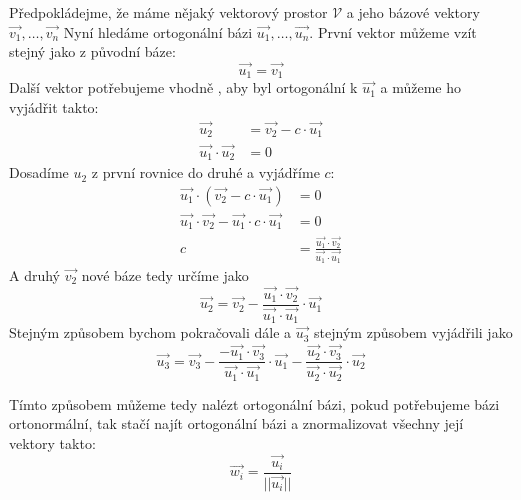 Předpokládejme, že máme nějaký vektorový prostor $\mathcal{V}$ a jeho bázové
vektory $\vec{v_1}, \ldots, \vec{v_n}$
Nyní hledáme ortogonální bázi $\vec{u_1}, \ldots, \vec{u_n}$.
První vektor můžeme vzít stejný jako z původní báze:
$$\vec{u_1} = \vec{v_1}$$
Další vektor potřebujeme vhodně , aby byl ortogonální
k $\vec{u_1}$ a můžeme ho vyjádřit takto:
\begin{align*}
    \vec{u_2} &= \vec{v_2} - c \cdot \vec{u_1}\\
    \vec{u_1} \cdot \vec{u_2} &= 0
\end{align*}
Dosadíme $u_2$ z první rovnice do druhé a vyjádříme $c$:
\begin{align*}
    \vec{u_1} \cdot (\vec{v_2} - c \cdot \vec{u_1}) &= 0\\
    \vec{u_1} \cdot \vec{v_2} - \vec{u_1} \cdot c \cdot \vec{u_1} &= 0\\
    c &= \frac{\vec{u_1} \cdot \vec{v_2}}{\vec{u_1}\cdot \vec{u_1}}
\end{align*}
A druhý  $\vec{v_2}$ nové báze tedy určíme jako
$$\vec{u_2} = \vec{v_2} - \frac{\vec{u_1} \cdot \vec{v_2}}{\vec{u_1}\cdot
    \vec{u_1}} \cdot \vec{u_1}$$
Stejným způsobem bychom pokračovali dále a $\vec{u_3}$ stejným způsobem vyjádřili
jako
$$\vec{u_3} = \vec{v_3} - \frac{-\vec{u_1}\cdot \vec{v_3}}{\vec{u_1} \cdot \vec{u_1}}\cdot
    \vec{u_1} - \frac{\vec{u_2}\cdot \vec{v_3}}{\vec{u_2} \cdot \vec{u_2}}\cdot \vec{u_2}$$

Tímto způsobem můžeme tedy nalézt ortogonální bázi, pokud potřebujeme bázi ortonormální, tak
stačí najít ortogonální bázi a znormalizovat všechny její vektory takto:
$$\vec{w_i} = \frac{\vec{u_i}}{||\vec{u_i}||}$$

